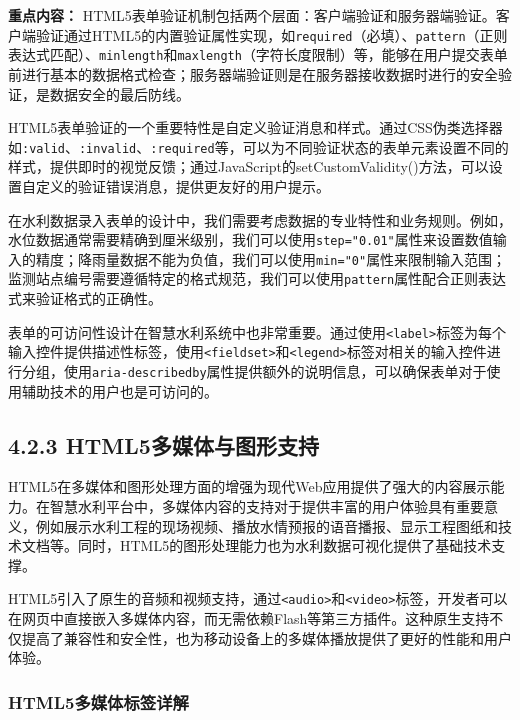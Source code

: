 \textbf{重点内容：} HTML5表单验证机制包括两个层面：客户端验证和服务器端验证。客户端验证通过HTML5的内置验证属性实现，如\texttt{required}（必填）、\texttt{pattern}（正则表达式匹配）、\texttt{minlength}和\texttt{maxlength}（字符长度限制）等，能够在用户提交表单前进行基本的数据格式检查；服务器端验证则是在服务器接收数据时进行的安全验证，是数据安全的最后防线。

HTML5表单验证的一个重要特性是自定义验证消息和样式。通过CSS伪类选择器如\texttt{:valid}、\texttt{:invalid}、\texttt{:required}等，可以为不同验证状态的表单元素设置不同的样式，提供即时的视觉反馈；通过JavaScript的setCustomValidity()方法，可以设置自定义的验证错误消息，提供更友好的用户提示。

在水利数据录入表单的设计中，我们需要考虑数据的专业特性和业务规则。例如，水位数据通常需要精确到厘米级别，我们可以使用\texttt{step="0.01"}属性来设置数值输入的精度；降雨量数据不能为负值，我们可以使用\texttt{min="0"}属性来限制输入范围；监测站点编号需要遵循特定的格式规范，我们可以使用\texttt{pattern}属性配合正则表达式来验证格式的正确性。

表单的可访问性设计在智慧水利系统中也非常重要。通过使用\texttt{\textless{}label\textgreater{}}标签为每个输入控件提供描述性标签，使用\texttt{\textless{}fieldset\textgreater{}}和\texttt{\textless{}legend\textgreater{}}标签对相关的输入控件进行分组，使用\texttt{aria-describedby}属性提供额外的说明信息，可以确保表单对于使用辅助技术的用户也是可访问的。

\subsection{4.2.3 HTML5多媒体与图形支持}\label{html5ux591aux5a92ux4f53ux4e0eux56feux5f62ux652fux6301}

HTML5在多媒体和图形处理方面的增强为现代Web应用提供了强大的内容展示能力。在智慧水利平台中，多媒体内容的支持对于提供丰富的用户体验具有重要意义，例如展示水利工程的现场视频、播放水情预报的语音播报、显示工程图纸和技术文档等。同时，HTML5的图形处理能力也为水利数据可视化提供了基础技术支撑。

HTML5引入了原生的音频和视频支持，通过\texttt{\textless{}audio\textgreater{}}和\texttt{\textless{}video\textgreater{}}标签，开发者可以在网页中直接嵌入多媒体内容，而无需依赖Flash等第三方插件。这种原生支持不仅提高了兼容性和安全性，也为移动设备上的多媒体播放提供了更好的性能和用户体验。

\subsubsection{HTML5多媒体标签详解}\label{html5ux591aux5a92ux4f53ux6807ux7b7eux8be6ux89e3}

